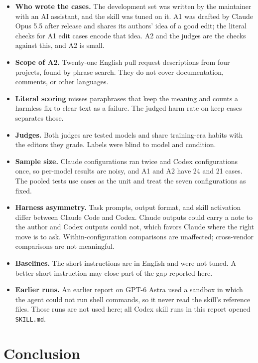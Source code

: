 \documentclass[11pt]{article}
\newcommand{\code}[1]{\texttt{#1}}
\begin{document}
\begin{itemize}
  \item \textbf{Who wrote the cases.} The development set was written by the maintainer
    with an AI assistant, and the skill was tuned on it. A1 was drafted by Claude Opus 5.5
    after release and shares its authors' idea of a good edit; the literal checks for A1
    edit cases encode that idea. A2 and the judges are the checks against this, and A2 is
    small.
  \item \textbf{Scope of A2.} Twenty-one English pull request descriptions from four
    projects, found by phrase search. They do not cover documentation, comments, or other
    languages.
  \item \textbf{Literal scoring} misses paraphrases that keep the meaning and counts a
    harmless fix to clear text as a failure. The judged harm rate on keep cases separates
    those.
  \item \textbf{Judges.} Both judges are tested models and share training-era habits with
    the editors they grade. Labels were blind to model and condition.
  \item \textbf{Sample size.} Claude configurations ran twice and Codex configurations
    once, so per-model results are noisy, and A1 and A2 have 24 and 21 cases. The pooled tests use cases as the unit and treat
    the seven configurations as fixed.
  \item \textbf{Harness asymmetry.} Task prompts, output format, and skill activation
    differ between Claude Code and Codex. Claude outputs could carry a note to the author
    and Codex outputs could not, which favors Claude where the right move is to ask.
    Within-configuration comparisons are unaffected; cross-vendor comparisons are not
    meaningful.
  \item \textbf{Baselines.} The short instructions are in English and were not tuned. A
    better short instruction may close part of the gap reported here.
  \item \textbf{Earlier runs.} An earlier report on GPT-6 Astra used a sandbox in which
    the agent could not run shell commands, so it never read the skill's reference files.
    Those runs are not used here; all Codex skill runs in this report opened
    \code{SKILL.md}.
\end{itemize}

\section{Conclusion}
\end{document}
